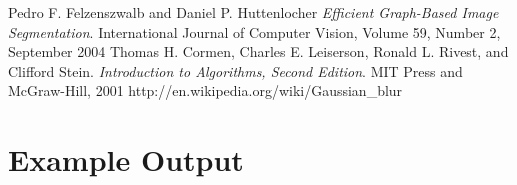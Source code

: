 \pagebreak

\begin{thebibliography}{9}
    Pedro F. Felzenszwalb and Daniel P. Huttenlocher
    \emph{Efficient Graph-Based Image Segmentation}.
    International Journal of Computer Vision, Volume 59, Number 2, September 2004
    Thomas H. Cormen, Charles E. Leiserson, Ronald L. Rivest, and Clifford Stein. 
    \emph{Introduction to Algorithms, Second Edition}. MIT Press and McGraw-Hill, 2001
    http://en.wikipedia.org/wiki/Gaussian\_blur
\end{thebibliography}


\pagebreak

\appendix
\section{Example Output}

